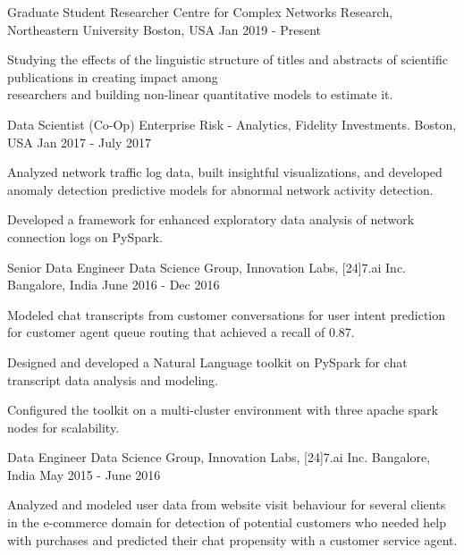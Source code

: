 \begin{cventries}
  \cventry
    {Graduate Student Researcher}
    {Centre for Complex Networks Research, Northeastern University}
    {Boston, USA}
    {Jan 2019 - Present}
    {
      \begin{cvitems}
        \item {Studying the effects of the linguistic structure of titles and abstracts of scientific publications in creating impact among \\ researchers and building non-linear quantitative models to estimate it.}
        \end{cvitems}
    }
  \cventry
    {Data Scientist (Co-Op)}
    {Enterprise Risk - Analytics, Fidelity Investments.}
    {Boston, USA}
    {Jan 2017 - July 2017}
    {
      \begin{cvitems}
        \item {Analyzed network traffic log data, built insightful visualizations, and developed anomaly detection predictive models for abnormal network activity detection.}
        \item {Developed a framework for enhanced exploratory data analysis of network connection logs on PySpark.}
      \end{cvitems}
    }
  \cventry
    {Senior Data Engineer}
    {Data Science Group, Innovation Labs, [24]7.ai Inc.}
    {Bangalore, India}
    {June 2016 - Dec 2016}
    {
      \begin{cvitems}
        \item {Modeled chat transcripts from customer conversations for user intent prediction for customer agent queue routing that achieved a recall of 0.87.}
        \item {Designed and developed a Natural Language toolkit on PySpark for chat transcript data analysis and modeling.}
        \item {Configured the toolkit on a multi-cluster environment with three apache spark nodes for scalability.}
      \end{cvitems}
    }
  \cventry
    {Data Engineer}
    {Data Science Group, Innovation Labs, [24]7.ai Inc.}  
    {Bangalore, India}
    {May 2015 - June 2016}
    {
      \begin{cvitems}
        \item {Analyzed and modeled user data from website visit behaviour for several clients in the e-commerce domain for detection of potential customers who needed help with purchases and predicted their chat propensity with a customer service agent.}

\end{cvitems}}
\end{cventries}
